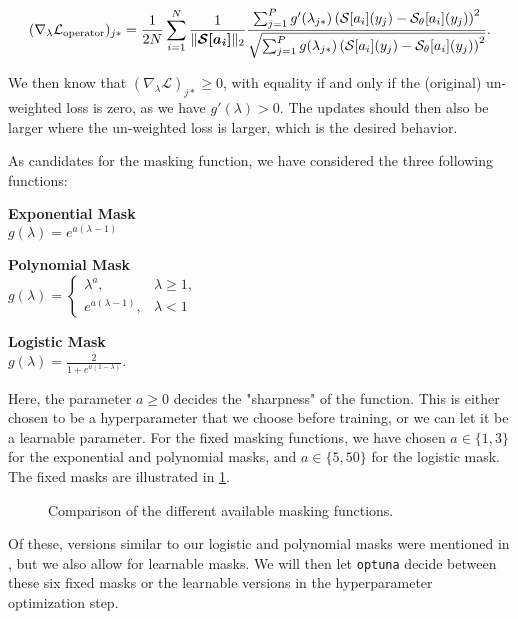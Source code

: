 \begin{equation}
    (\nabla_{\lambda} \mathcal{L}_{\text{operator}})_{j*} = \frac{1}{2 N} \sum_{i=1}^{N}
    \frac{1}{\|\bm{\mathcal{S}[a_i]}\|_2} 
    \frac{\sum_{j=1}^P g'(\lambda_{j*}) 
    \left(\mathcal{S}[a_i](y_j)-\mathcal{S}_\theta[a_i](y_j)\right)^2}
    {\sqrt{\sum_{j=1}^P g(\lambda_{j*}) 
    \left(\mathcal{S}[a_i](y_j)-\mathcal{S}_\theta[a_i](y_j)\right)^2}}.
\end{equation}

We then know that \((\nabla_{\lambda} \mathcal{L})_{j*}\geq 0\), with equality if and only if the (original) un-weighted loss is zero, as we have \(g'(\lambda) > 0\). 
The updates should then also be larger where the un-weighted loss is larger, which is the desired behavior.

As candidates for the masking function, we have considered the three following functions:

\begin{multicols}{3}
\centering
\textbf{Exponential Mask} \\[0.5em]
$g(\lambda) = e^{a(\lambda - 1)}$ 
\columnbreak

\centering
\textbf{Polynomial Mask} \\[0.5em]
$g(\lambda) = 
\begin{cases} 
\lambda^{a}, & \lambda \geq 1, \\ 
e^{a(\lambda - 1)}, & \lambda < 1 
\end{cases}$
\columnbreak

\centering
\textbf{Logistic Mask} \\[0.5em]
$g(\lambda) = \frac{2}{1 + e^{a (1-\lambda)}}$.
\end{multicols}

Here, the parameter \(a\geq0\) decides the "sharpness" of the function. This is either chosen to be a hyperparameter that we
choose before training, or we can let it be a learnable parameter. For the fixed masking functions, we have chosen
\(a \in \{1,3\}\) for the exponential and polynomial masks, and \(a \in \{5, 50\}\) for the logistic mask. The fixed masks are
illustrated in \cref{fig:masking_functions}.

\begin{figure}[h!]
    \centering
    
    \caption[Masking functions]{Comparison of the different available masking functions.}
    \label{fig:masking_functions}
\end{figure}

Of these, versions similar to our logistic and polynomial masks were 
mentioned in , but we also
allow for learnable masks. We will then let \texttt{optuna} decide between these six fixed masks or the learnable versions in the hyperparameter optimization step.

